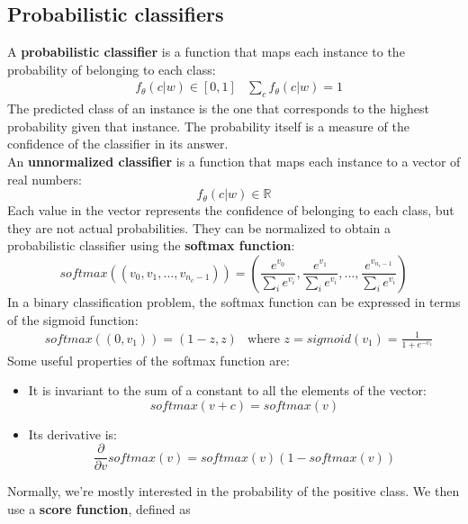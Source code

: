 \subsection{Probabilistic classifiers}
A \textbf{probabilistic classifier} is a function that maps each instance to the probability of belonging to each class:
\begin{align*}
    &f_{\theta}(c|w) \in [0,1] &\sum_c f_{\theta}(c|w) = 1
\end{align*}
The predicted class of an instance is the one that corresponds to the highest probability given that instance. The probability itself is a measure of the confidence of the classifier in its answer. \\
An \textbf{unnormalized classifier} is a function that maps each instance to a vector of real numbers:
\begin{equation*}
    f_{\theta}(c|w) \in \mathbb{R}
\end{equation*}
Each value in the vector represents the confidence of belonging to each class, but they are not actual probabilities. They can be normalized to obtain a probabilistic classifier using the \textbf{softmax function}:
\begin{equation*}
    \textit{softmax}((v_0, v_1, \ldots, v_{n_c - 1})) = \left( \frac{e^{v_0}}{\sum_i e^{v_i}}, \frac{e^{v_1}}{\sum_i e^{v_i}}, \dots, \frac{e^{v_{n_c - 1}}}{\sum_i e^{v_i}} \right)
\end{equation*}
In a binary classification problem, the softmax function can be expressed in terms of the sigmoid function:
\begin{align*}
    &\textit{softmax}((0,v_1)) = (1-z, z) &\text{where }z = \textit{sigmoid}(v_1) = \frac{1}{1 + e^{-v_1}}
\end{align*}
Some useful properties of the softmax function are:
\begin{itemize}[noitemsep]
    \item It is invariant to the sum of a constant to all the elements of the vector:
    \begin{equation*}
        \textit{softmax}(v + c) = \textit{softmax}(v)
    \end{equation*}
    \item Its derivative is:
    \begin{equation*}
        \frac{\partial}{\partial v} \textit{softmax}(v) = \textit{softmax}(v) (1 - \textit{softmax}(v))
    \end{equation*}
\end{itemize}
Normally, we're mostly interested in the probability of the positive class. We then use a \textbf{score function}, defined as
